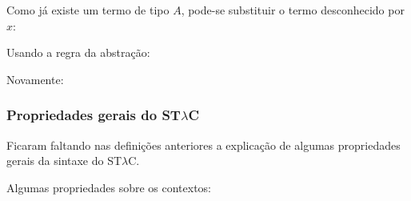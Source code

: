 \documentclass[../main.tex]{subfiles}
\begin{document}
\begin{prooftree}
\end{prooftree}

Como já existe um termo de tipo $A$, pode-se substituir o termo desconhecido por $x$:

\begin{prooftree}
\end{prooftree}

Usando a regra da abstração:

\begin{prooftree}
\end{prooftree}


Novamente:

\begin{prooftree}
\end{prooftree}

\subsubsection[Propriedades gerais do STLC]{Propriedades gerais do ST$\lambda$C}

Ficaram faltando nas definições anteriores a explicação de algumas propriedades gerais da sintaxe do ST$\lambda$C.

Algumas propriedades sobre os contextos:
\end{document}
